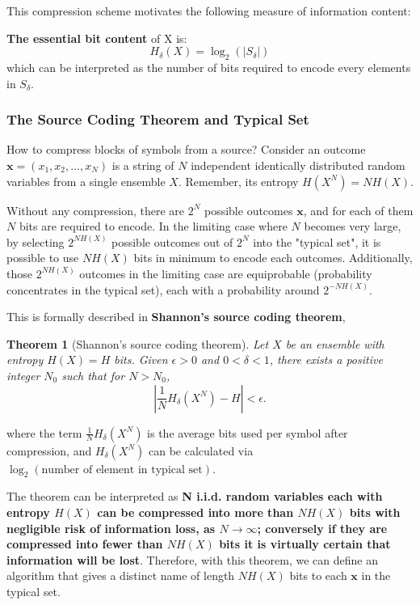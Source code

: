 \documentclass[11pt]{article}
\newtheorem{theorem}{Theorem}
\begin{document}
This compression scheme motivates the following measure of information content:

\noindent \textbf{The essential bit content} of X is:
\[
  H_\delta(X) = \log_2(|S_\delta|)
\]
which can be interpreted as the number of bits required to encode every elements in $S_\delta$.

\subsubsection{The Source Coding Theorem and Typical Set}
How to compress blocks of symbols from a source? Consider an outcome $\mathbf{x} = (x_1,x_2,...,x_N)$ is a string of $N$ independent identically distributed random variables from a single ensemble $X$. Remember, its entropy $H(X^N) = NH(X)$.

Without any compression, there are $2^N$ possible outcomes $\mathbf{x}$, and for each of them $N$ bits are required to encode. In the limiting case where $N$ becomes very large, by selecting $2^{NH(X)}$ possible outcomes out of $2^N$ into the "typical set", it is possible to use $NH(X)$ bits in minimum to encode each outcomes. Additionally, those $2^{NH(X)}$ outcomes in the limiting case are equiprobable (probability concentrates in the typical set), each with a probability around $2^{-NH(X)}$.

This is formally described in \textbf{Shannon's source coding theorem},
\begin{theorem}[Shannon's source coding theorem]
Let $X$ be an ensemble with entropy $H(X)=H$ bits. Given $\epsilon>0$ and $0<\delta<1$, there exists a positive integer $N_0$ such that for $N>N_0$,
\[
  \left|\frac{1}{N}H_\delta\left(X^N\right)-H\right|<\epsilon.
\]
\end{theorem}
\noindent where the term $\frac{1}{N}H_\delta\left(X^N\right)$ is the average bits used per symbol after compression, and $H_\delta\left(X^N\right)$ can be calculated via $\log_2(\text{number of element in typical set})$. 

The theorem can be interpreted as \textbf{N i.i.d. random variables each with entropy $H(X)$ can be compressed into more than $NH(X)$ bits with negligible risk of information loss, as $N \to \infty$; conversely if they are compressed into fewer than $NH(X)$ bits it is virtually certain that information will be lost}. Therefore, with this theorem, we can define an algorithm that gives a distinct name of length $NH(X)$ bits to each $\mathbf{x}$ in the typical set.
\end{document}

